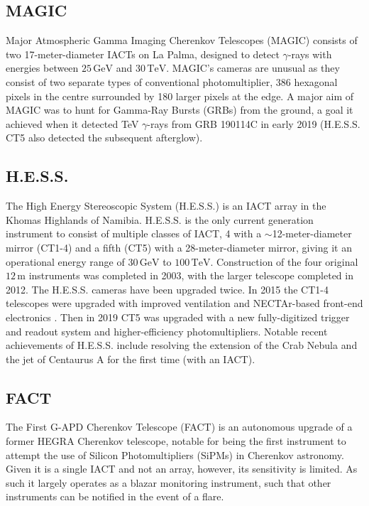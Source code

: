 \subsection{MAGIC}
Major Atmospheric Gamma Imaging Cherenkov Telescopes (MAGIC) consists of two 17-meter-diameter IACTs on La Palma, designed to detect $\gamma$-rays with energies between $\mathrm{25\,GeV}$ and $\mathrm{30\,TeV}$. MAGIC's cameras are unusual as they consist of two separate types of conventional photomultiplier, 386 hexagonal pixels in the centre surrounded by 180 larger pixels at the edge. A major aim of MAGIC was to hunt for Gamma-Ray Bursts (GRBs) from the ground, a goal it achieved when it detected TeV $\gamma$-rays from GRB 190114C in early 2019 \cite{magicGRB} (H.E.S.S. CT5 also detected the subsequent afterglow).

\subsection{H.E.S.S.}
The High Energy Stereoscopic System (H.E.S.S.) is an IACT array in the Khomas Highlands of Namibia. H.E.S.S. is the only current generation instrument to consist of multiple classes of IACT, 4 with a $\sim$12-meter-diameter mirror (CT1-4) and a fifth (CT5) with a 28-meter-diameter mirror, giving it an operational energy range of $\mathrm{30\,GeV}$ to $\mathrm{100\,TeV}$. Construction of the four original $\mathrm{12\,m}$ instruments was completed in 2003, with the larger telescope completed in 2012. The H.E.S.S. cameras have been upgraded twice. In 2015 the CT1-4 telescopes were upgraded with improved ventilation and NECTAr-based front-end electronics \cite{hess1u}. Then in 2019 CT5 was upgraded with a new fully-digitized trigger and readout system and higher-efficiency photomultipliers. Notable recent achievements of H.E.S.S. include resolving the extension of the Crab Nebula \cite{crabextension} and the jet of Centaurus A \cite{cena} for the first time (with an IACT).

\subsection{FACT}
The First G-APD Cherenkov Telescope (FACT) is an autonomous upgrade of a former HEGRA Cherenkov telescope, notable for being the first instrument to attempt the use of Silicon Photomultipliers (SiPMs) in Cherenkov astronomy. Given it is a single IACT and not an array, however, its sensitivity is limited. As such it largely operates as a blazar monitoring instrument, such that other instruments can be notified in the event of a flare. 

